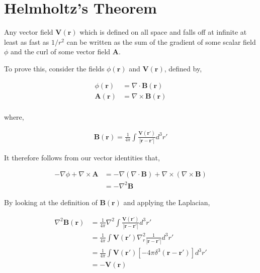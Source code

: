 \documentclass[11pt]{amsart}
\begin{document}
\section{Helmholtz's Theorem}

Any vector field $\mathbf{V}(\mathbf{r})$ which is defined on all space and falls off at infinite at least as fast as $1 / r^2$ can be written as the sum of the gradient of some scalar field $\phi$ and the curl of some vector field $\mathbf{A}$.

To prove this, consider the fields $\phi(\mathbf{r})$ and $\mathbf{V}(\mathbf{r})$, defined by,

\begin{align*}
  \phi(\mathbf{r})&=\nabla\cdot\mathbf{B}(\mathbf{r}) \\
  \mathbf{A}(\mathbf{r})&=\nabla\times\mathbf{B}(\mathbf{r}) \\
\end{align*}

where,

\begin{align*}
  \mathbf{B}(\mathbf{r})=\frac{1}{4\pi}\int\frac{\mathbf{V}(\mathbf{r'})}{|\mathbf{r}-\mathbf{r'}|} d^3r'
\end{align*}

It therefore follows from our vector identities that,

\begin{align*}
  -\nabla\phi + \nabla\times\mathbf{A} &= -\nabla(\nabla\cdot\mathbf{B})+\nabla\times(\nabla\times\mathbf{B}) \\
                                       &= -\nabla^2\mathbf{B}
\end{align*}

By looking at the definition of $\mathbf{B}(\mathbf{r})$ and applying the Laplacian,

\begin{align*}
  \nabla^2\mathbf{B}(\mathbf{r})&=\frac{1}{4\pi}\nabla^2\int\frac{\mathbf{V}(\mathbf{r'})}{|\mathbf{r}-\mathbf{r'}|}d^3r' \\
                                &=\frac{1}{4\pi}\int\mathbf{V}(\mathbf{r'})\nabla_r^2\frac{1}{|\mathbf{r}-\mathbf{r'}|}d^3r' \\
                                &=\frac{1}{4\pi}\int\mathbf{V}(\mathbf{r'})\left[-4\pi\delta^3(\mathbf{r}-\mathbf{r'})\right]d^3r' \\
                                &=-\mathbf{V}(\mathbf{r})
\end{align*}
\end{document}
